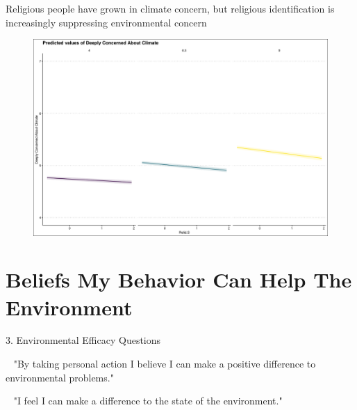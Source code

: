 \documentclass{beamer}
\begin{document}
\begin{frame}{Religious people have grown in climate concern, but religious identification is increasingly suppressing environmental concern}
\begin{figure}
\includegraphics[width=.8\textwidth,height=\textheight,keepaspectratio]{Figures/CONCERN_RELIDS_T.png}
\end{figure}
\end{frame}


\section{Beliefs My Behavior Can Help The Environment}
\begin{frame}{3. Environmental Efficacy Questions}
    

\begin{alertblock}{~}
"By taking personal action I believe I can make a positive difference to environmental problems."
\end{alertblock}

\begin{alertblock}{~}
"I feel I can make a difference to the state of the environment."
\end{alertblock}

\end{frame}
\end{document}
